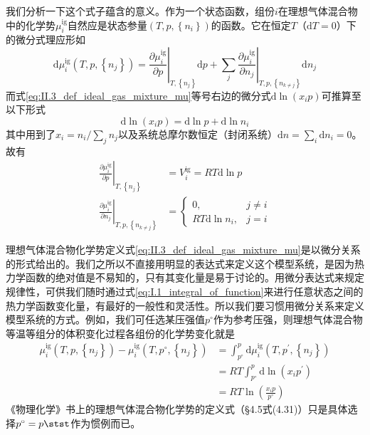 \documentclass[main.tex]{subfiles}
\begin{document}
我们分析一下这个式子蕴含的意义。作为一个状态函数，组份$i$在理想气体混合物中的化学势$\mu_i^\text{ig}$自然应是状态参量$\left(T,p,\left\{n_i\right\}\right)$的函数。它在恒定$T$（$\mathrm{d}T=0$）下的微分式理应形如
\[\mathrm{d}\mu_i^\text{ig}\left(T,p,\left\{n_j\right\}\right)=\left.\frac{\partial \mu_i^\text{ig}}{\partial p}\right|_{T,\left\{n_j\right\}}\mathrm{d}p+\sum_j\left.\frac{\partial\mu_i^\text{ig}}{\partial n_j}\right|_{T,p,\left\{n_{k\neq j}\right\}}\mathrm{d}n_j\]
而式\eqref{eq:II.3_def_ideal_gas_mixture_mu}等号右边的微分式$\mathrm{d}\ln\left(x_ip\right)$可推算至以下形式
\[\mathrm{d}\ln\left(x_ip\right)=\mathrm{d}\ln p+\mathrm{d}\ln n_i\]
其中用到了$x_i=n_i/\sum_jn_j$以及系统总摩尔数恒定（封闭系统）$\mathrm{d}n=\sum_i\mathrm{d}n_i=0$。故有
\begin{align*}
    \left.\frac{\partial \mu_i^\text{ig}}{\partial p}\right|_{T,\left\{n_j\right\}}             & =V_i^\text{ig}=RT\mathrm{d}\ln p                                                \\
    \left.\frac{\partial \mu_i^\text{ig}}{\partial n_j}\right|_{T,p,\left\{n_{k\neq j}\right\}} & =\left\{\begin{array}{ll}0,&j\neq i\\RT\mathrm{d}\ln n_i,&j=i\end{array}\right.
\end{align*}

理想气体混合物化学势定义式\eqref{eq:II.3_def_ideal_gas_mixture_mu}是以微分关系的形式给出的。我们之所以不直接用明显的表达式来定义这个模型系统，是因为热力学函数的绝对值是不易知的，只有其变化量是易于讨论的。用微分表达式来规定规律性，可供我们随时通过式\eqref{eq:I.1_integral_of_function}来进行任意状态之间的热力学函数变化量，有最好的一般性和灵活性。所以我们要习惯用微分关系来定义模型系统的方式。例如，我们可任选某压强值$p^\circ$作为参考压强，则理想气体混合物等温等组分的体积变化过程各组份的化学势变化就是
\begin{equation}\label{eq:II.3_ideal_gas_mixture_mu_p0}
    \begin{aligned}
        \mu_i^\text{ig}\left(T,p,\left\{n_j\right\}\right)-\mu_i^\text{ig}\left(T,p^\circ,\left\{n_j\right\}\right) & =\int_{p^\circ}^p\mathrm{d}\mu_i^\text{ig}\left(T,p^\prime,\left\{n_j\right\}\right) \\
                                                                                                                    & =RT\int_{p^\circ}^p\mathrm{d}\ln\left(x_ip^\prime\right)                             \\
                                                                                                                    & =RT\ln\left(\frac{x_ip}{p^\circ}\right)
    \end{aligned}
\end{equation}
《物理化学》书上的理想气体混合物化学势的定义式（\S 4.5式(4.31)）只是具体选择$p^\circ=p\stst$作为惯例而已。
\end{document}
